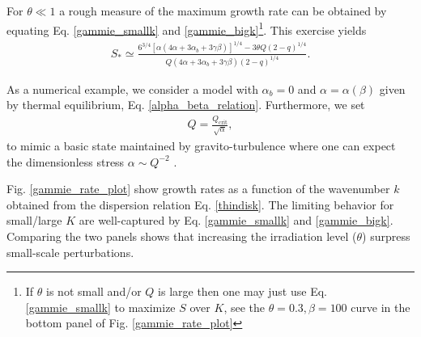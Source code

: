 For $\theta\ll1$ a rough measure of the maximum growth rate can be obtained by
equating Eq. \ref{gammie_smallk} and \ref{gammie_bigk}\footnote{If
  $\theta$ is not small and/or $Q$  is large then one may just use Eq. \ref{gammie_smallk}
  to maximize $S$ over $K$, see the $\theta=0.3,\beta=100$ curve in the bottom
  panel of Fig. \ref{gammie_rate_plot}}.  
This exercise yields 
\begin{align}\label{gammie_maxrate_simple}
  S_*\simeq \frac{
    6^{3/4}\left[\alpha\left(4\alpha +
      3\alpha_b + 3\gamma\beta\right)\right]^{1/4} - 3\theta
    Q(2-q)^{1/4}}{Q\left(4\alpha + 3\alpha_b +
    3\gamma\beta\right)(2-q)^{1/4}}. 
\end{align} 

As a numerical example, we consider a model with $\alpha_b=0$ and
$\alpha=\alpha(\beta)$ given by thermal equilibrium,
Eq. \ref{alpha_beta_relation}. Furthermore, we set
\begin{align}
  Q = \frac{Q_\mathrm{crit}}{\sqrt{\alpha}},\label{Qalpha}
\end{align}
to mimic a basic state maintained by gravito-turbulence where one can 
expect the dimensionless stress $\alpha \sim Q^{-2}$ \citep{lin87}.  

Fig. \ref{gammie_rate_plot} show growth rates as a function of the
wavenumber $k$ obtained from the dispersion relation
Eq. \ref{thindisk}. The limiting behavior for small/large $K$ are
well-captured by Eq. \ref{gammie_smallk} and
\ref{gammie_bigk}. Comparing the two panels shows that increasing the
irradiation level ($\theta$) surpress  
small-scale perturbations.    

